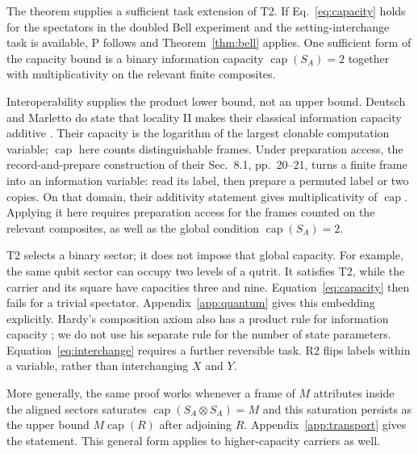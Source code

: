 \documentclass[a4paper,11pt,twocolumn,unpublished]{quantumarticle}
\DeclareMathOperator{\capn}{cap}
\begin{document}
The theorem supplies a sufficient task extension of T2. If Eq.~\eqref{eq:capacity} holds for the spectators in the doubled Bell experiment and the setting-interchange task is available, P follows and Theorem~\ref{thm:bell} applies. One sufficient form of the capacity bound is a binary information capacity $\capn(S_A)=2$ together with multiplicativity on the relevant finite composites.

Interoperability supplies the product lower bound, not an upper bound. Deutsch and Marletto do state that locality II makes their classical information capacity additive \cite[Sec.~4, p.~10]{cti}. Their capacity is the logarithm of the largest clonable computation variable; $\capn$ here counts distinguishable frames. Under preparation access, the record-and-prepare construction of their Sec.~8.1, pp.~20--21, turns a finite frame into an information variable: read its label, then prepare a permuted label or two copies. On that domain, their additivity statement gives multiplicativity of $\capn$. Applying it here requires preparation access for the frames counted on the relevant composites, as well as the global condition $\capn(S_A)=2$.

T2 selects a binary sector; it does not impose that global capacity. For example, the same qubit sector can occupy two levels of a qutrit. It satisfies T2, while the carrier and its square have capacities three and nine. Equation~\eqref{eq:capacity} then fails for a trivial spectator. Appendix~\ref{app:quantum} gives this embedding explicitly. Hardy's composition axiom also has a product rule for information capacity \cite[Axiom 4]{hardy}; we do not use his separate rule for the number of state parameters. Equation~\eqref{eq:interchange} requires a further reversible task. R2 flips labels within a variable, rather than interchanging $X$ and $Y$.

More generally, the same proof works whenever a frame of $M$ attributes inside the aligned sectors saturates $\capn(S_A\otimes S_A)=M$ and this saturation persists as the upper bound $M\capn(R)$ after adjoining $R$. Appendix~\ref{app:transport} gives the statement. This general form applies to higher-capacity carriers as well.
\end{document}
